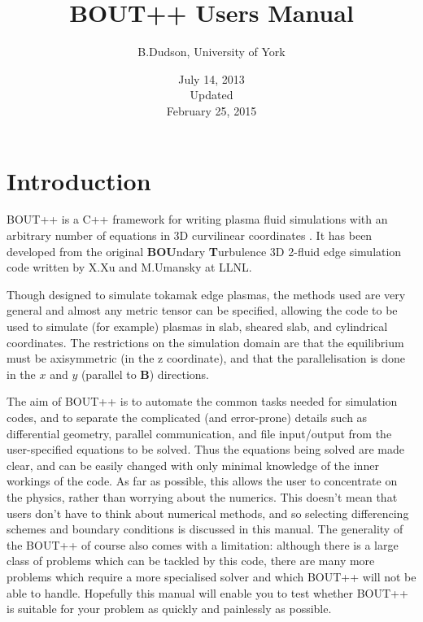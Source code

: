 \documentclass[12pt]{article}
\begin{document}
\title{BOUT++ Users Manual}
\author{B.Dudson, University of York}
\date{July 14, 2013\\Updated\\ February 25, 2015}
\maketitle

\tableofcontents

\section{Introduction}
BOUT++ is a C++ framework for writing plasma fluid simulations with an arbitrary number of equations
in 3D curvilinear coordinates \cite{Dudson2009,dudson-2008-arxiv}. It has been developed from the original {\bf BOU}ndary {\bf T}urbulence
3D 2-fluid edge simulation code \cite{bout_manual,umansky-2008-bout,xu-2008} written by X.Xu and M.Umansky at LLNL.

Though designed to simulate tokamak edge plasmas, the methods used are very general and almost
any metric tensor can be specified, allowing the code to be used to simulate (for example) plasmas in 
slab, sheared slab, and cylindrical coordinates. The restrictions on the simulation domain
are that the equilibrium must be axisymmetric (in the z coordinate), and that the parallelisation
is done in the $x$ and $y$ (parallel to $\mathbf{B}$) directions.

The aim of BOUT++ is to automate the common tasks needed for simulation codes, and to separate the
complicated (and error-prone) details such as differential geometry, parallel communication, and
file input/output from the user-specified equations to be solved. Thus the equations being solved
are made clear, and can be easily changed with only minimal knowledge of the inner workings of the
code. As far as possible, this allows the user to concentrate on the physics, rather than worrying
about the numerics. This doesn't mean that users don't have to think about numerical methods, and so selecting differencing schemes and boundary conditions is discussed in this manual. The generality of the BOUT++ of course also comes with a limitation: although there is a large class of problems which can be tackled by this code, there are many more problems which require a more specialised solver and which BOUT++ will not be able to handle. Hopefully this manual will enable you to test whether BOUT++ is suitable for your problem as quickly and painlessly as possible.
\end{document}
